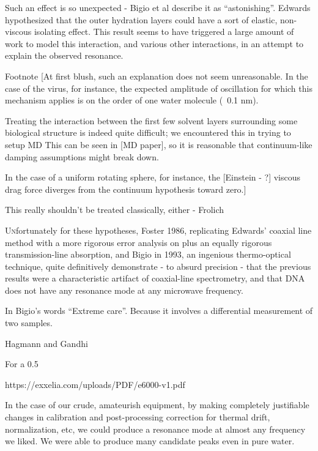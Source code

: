 \documentclass[paper.tex]{subfiles}
\begin{document}
Such an effect is so unexpected - Bigio et al describe it as “astonishing”. Edwards hypothesized that the outer hydration layers could have a sort of elastic, non-viscous isolating effect. This result seems to have triggered a large amount of work to model this interaction, and various other interactions, in an attempt to explain the observed resonance.

Footnote [At first blush, such an explanation does not seem unreasonable. In the case of the virus, for instance, the expected amplitude of oscillation for which this mechanism applies is on the order of one water molecule (~0.1 nm).

Treating the interaction between the first few solvent layers surrounding some biological structure is indeed quite difficult; we encountered this in trying to setup MD This can be seen in [MD paper], so it is reasonable that continuum-like damping assumptions might break down. 

In the case of a uniform rotating sphere, for instance, the [Einstein - ?] viscous drag force diverges from the continuum hypothesis toward zero.]

This really shouldn’t be treated classically, either - Frolich 

\lettrine{U}nfortunately for these hypotheses, Foster 1986, replicating Edwards’ coaxial line method with a more rigorous error analysis on plus an equally rigorous transmission-line absorption, and Bigio in 1993, an ingenious thermo-optical technique, quite definitively demonstrate - to absurd precision -  that the previous results were a characteristic artifact of coaxial-line spectrometry, and that DNA does not have any resonance mode at any microwave frequency.

In Bigio’s words “Extreme care”. Because it involves a differential measurement of two samples.

Hagmann and Gandhi \cite{Substitution1982}



For a 0.5%

https://exxelia.com/uploads/PDF/e6000-v1.pdf


In the case of our crude, amateurish equipment, by making completely justifiable changes in calibration and post-processing correction for thermal drift, normalization, etc, we could produce a resonance mode at almost any frequency we liked. We were able to produce many candidate peaks even in pure water.
\end{document}
